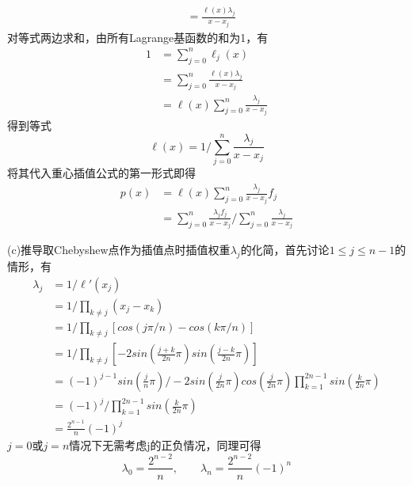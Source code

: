 \documentclass[12pt,a4paper,utf8]{ctexart}
\begin{document}
\begin{enumerate}
\begin{equation}
\begin{aligned}
      &= \frac{\ell (x) \lambda _j}{x-x_j} \nonumber
   \end{aligned}
\end{equation}
对等式两边求和，由所有Lagrange基函数的和为1，有
\begin{equation}
   \begin{aligned}
      1 &= \sum_{j=0}^n \ell_j(x) \\ \nonumber
      &= \sum_{j=0}^n \frac{\ell (x) \lambda _j}{x-x_j} \\ \nonumber
      &= \ell (x) \sum_{j=0}^n \frac{\lambda _j}{x-x_j} \nonumber
   \end{aligned}
\end{equation}
得到等式
\begin{equation}
   \ell (x) = 1 \bigg/ \sum_{j=0}^n \frac{\lambda _j}{x-x_j} \nonumber
\end{equation}
将其代入重心插值公式的第一形式即得
\begin{equation}
   \begin{aligned}
   p(x) &= \ell (x) \sum_{j=0}^n \frac{\lambda_j}{x-x_j} f_j \\ \nonumber
   &= \sum_{j=0}^n \frac{\lambda_j f_j}{x-x_j} \bigg/ \sum_{j=0}^n \frac{\lambda _j}{x-x_j} \nonumber
   \end{aligned}
\end{equation}

(c)推导取Chebyshew点作为插值点时插值权重$\lambda _j$的化简，首先讨论$1\le j \le n-1$的情形，有
\begin{equation}
   \begin{aligned}
      \lambda_j &= 1 \bigg/ \ell '(x_j) \\ \nonumber
      &= 1 \bigg/ \prod_{k \neq j} (x_j - x_k) \\ \nonumber
      &= 1 \bigg/ \prod_{k \neq j} [cos(j\pi /n)-cos(k\pi /n)] \\ \nonumber
      &= 1 \bigg/ \prod_{k \neq j} [-2sin(\frac{j+k}{2n} \pi)sin(\frac{j-k}{2n} \pi)] \\ \nonumber
      &= (-1)^{j-1} sin(\frac{j}{n} \pi )\bigg/ -2sin(\frac{j}{2n} \pi )cos(\frac{j}{2n} \pi )\prod_{k=1}^{2n-1} sin(\frac{k}{2n} \pi ) \\ \nonumber  
      &= (-1)^j \bigg/ \prod_{k=1}^{2n-1} sin(\frac{k}{2n} \pi ) \\ \nonumber
      &= \frac{2^{n-1}}{n} (-1)^j \nonumber
   \end{aligned}
\end{equation}
$j=0$或$j=n$情况下无需考虑j的正负情况，同理可得
\begin{equation}
   \lambda_0 = \frac{2^{n-2}}{n} ,\qquad \lambda_n = \frac{2^{n-2}}{n}(-1)^n \nonumber
\end{equation}


\end{enumerate}
\end{document}
